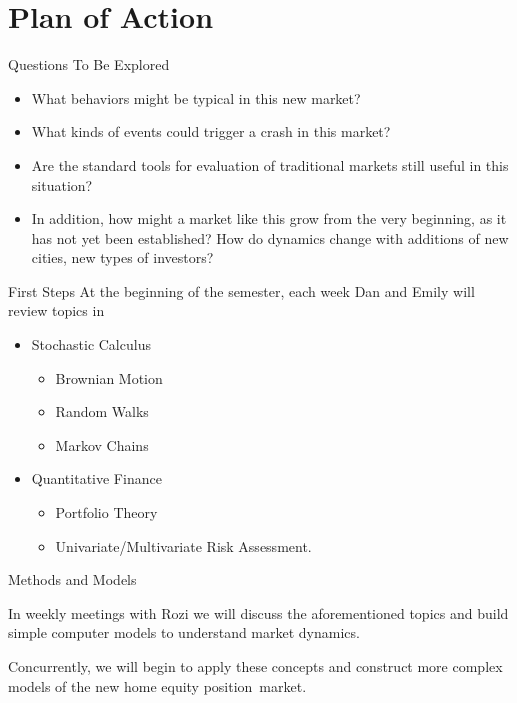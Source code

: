 \documentclass{beamer}
\newcommand{\hep}{home equity position}
\begin{document}
\section{Plan of Action}
\begin{frame}{Questions To Be Explored}
\pause
\begin{itemize}
\item
What behaviors might be typical in this new market?
\pause
\item
What kinds of events could trigger a crash in this market?
\pause
\item
Are the standard tools for evaluation of traditional markets still useful in this situation?
\pause
\item
In addition, how might a market like this grow from the very beginning, as it has not yet been established? How do dynamics change with additions of new cities, new types of investors?
\end{itemize}
\end{frame}

\begin{frame}{First Steps}
At the beginning of the semester, each week Dan and Emily will review topics in
\begin{itemize}
\item
Stochastic Calculus
\begin{itemize}
\item
Brownian Motion
\item
Random Walks
\item
Markov Chains
\end{itemize}
\item
Quantitative Finance
\begin{itemize}
\item
Portfolio Theory
\item
Univariate/Multivariate Risk Assessment.
\end{itemize}
\end{itemize}

\end{frame}

\begin{frame}{Methods and Models}

In weekly meetings with Rozi we will discuss the aforementioned topics and build simple computer models to understand market dynamics.

Concurrently, we will begin to apply these concepts and construct more complex models of the new \hep\ market.
\end{frame}
\end{document}
